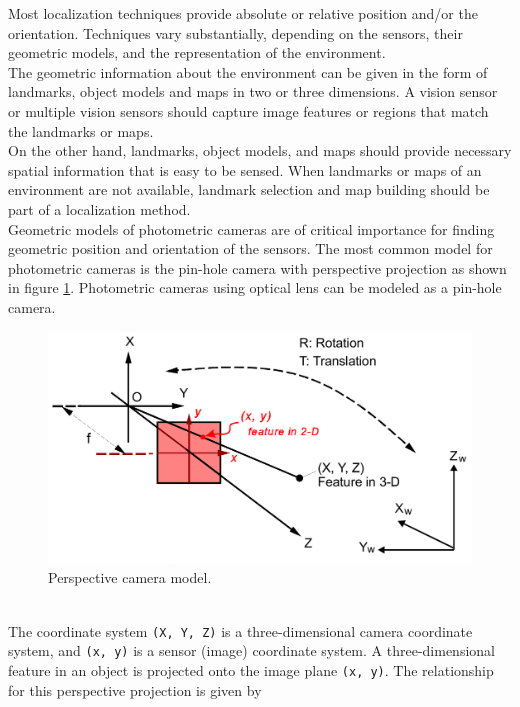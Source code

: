 Most localization techniques provide absolute or relative position and/or
the orientation. Techniques vary substantially, depending on the sensors,
their geometric models, and the representation of the environment.
\\
The geometric information about the environment can be given in the form
of landmarks, object models and maps in two or three dimensions. A vision
sensor or multiple vision sensors should capture image features or regions
that match the landmarks or maps.
\\
On the other hand, landmarks, object models, and maps should provide necessary
spatial information that is easy to be sensed. When landmarks or maps of an
environment are not available, landmark selection and map building should
be part of a localization method.
\\
Geometric models of photometric cameras are of critical importance for
finding geometric position and orientation of the sensors. The most common
model for photometric cameras is the pin-hole camera with perspective projection
as shown in figure \ref{fig:camera_system}. Photometric cameras using optical lens can
be modeled as a pin-hole camera.
\begin{figure} [h]
  \begin{center}
    \includegraphics[width=350pt]{img/camera_system.png}
    \caption{Perspective camera model.}
    \label{fig:camera_system}
  \end{center}
\end{figure}
\\
The coordinate system \texttt{(X, Y, Z)} is a three-dimensional camera coordinate
system, and \texttt{(x, y)} is a sensor (image) coordinate system.
A three-dimensional
feature in an object is projected onto the image plane \texttt{(x, y)}.
The relationship
for this perspective projection is given by

